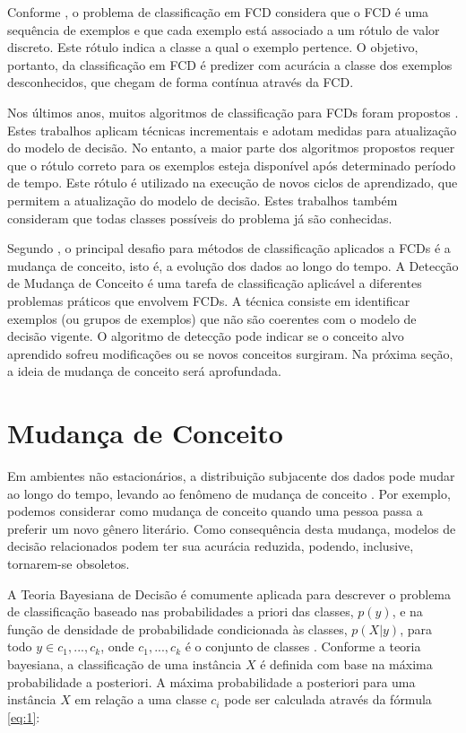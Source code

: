 \documentclass[qual, classic, a4paper]{ufbathesis}
\begin{document}
Conforme \cite{Chen:Tu}, o problema de classificação em FCD considera que o FCD é uma sequência de exemplos e que cada exemplo está associado a um rótulo de valor discreto.
Este rótulo indica a classe a qual o exemplo pertence.
O objetivo, portanto, da classificação em FCD é predizer com acurácia a classe dos exemplos desconhecidos, que chegam de forma contínua através da FCD.

Nos últimos anos, muitos algoritmos de classificação para FCDs foram propostos 
\cite{Domingos:2000:MHD:347090.347107, Bifet:2013:EDS:2480362.2480516, Wang:2003:MCD:956750.956778, Aggarwal:2004:DCD:1014052.1014110, Gama:2003:ADT:956750.956813}.
Estes trabalhos aplicam técnicas incrementais e adotam medidas para atualização do modelo de decisão.
No entanto, a maior parte dos algoritmos propostos requer que o rótulo correto para os exemplos esteja disponível após determinado período de tempo.
Este rótulo é utilizado na execução de novos ciclos de aprendizado, que permitem a atualização do modelo de decisão.
Estes trabalhos também consideram que todas classes possíveis do problema já são conhecidas. 

Segundo \cite{Aggarwal:2006:DSM:1196418}, o principal desafio para métodos de classificação aplicados a FCDs é a mudança de conceito,
isto é, a evolução dos dados ao longo do tempo.
A Detecção de Mudança de Conceito é uma tarefa de classificação aplicável a diferentes problemas práticos que envolvem FCDs.
A técnica consiste em identificar exemplos (ou grupos de exemplos) que não são coerentes com o modelo de decisão vigente.
O algoritmo de detecção pode indicar se o conceito alvo aprendido sofreu modificações ou se novos conceitos surgiram.
Na próxima seção, a ideia de mudança de conceito será aprofundada.

\section{Mudança de Conceito}

Em ambientes não estacionários, a distribuição subjacente dos dados pode mudar ao longo do tempo, levando ao fenômeno de mudança de conceito \cite{Schlimmer1986}.
Por exemplo, podemos considerar como mudança de conceito quando uma pessoa passa a preferir um novo gênero literário.
Como consequência desta mudança, modelos de decisão relacionados podem ter sua acurácia reduzida, podendo, inclusive, tornarem-se obsoletos.

A Teoria Bayesiana de Decisão \cite{Duda:2000:PC:954544} é comumente aplicada para descrever o problema de classificação baseado 
nas probabilidades a priori das classes, $p(y)$, e na função de densidade de probabilidade condicionada às classes, $p(X|y)$, para todo 
$y \in {c_1, ..., c_k}$, onde $c_1, ..., c_k$ é o conjunto de classes \cite{Zliobaite:2010, Gama:2014:SCD:2597757.2523813}.
Conforme a teoria bayesiana, a classificação de uma instância $X$ é definida com base na máxima probabilidade a posteriori.
A máxima probabilidade a posteriori para uma instância $X$ em relação a uma classe $c_i$ pode ser calculada através da fórmula \ref{eq:1}:
\end{document}
